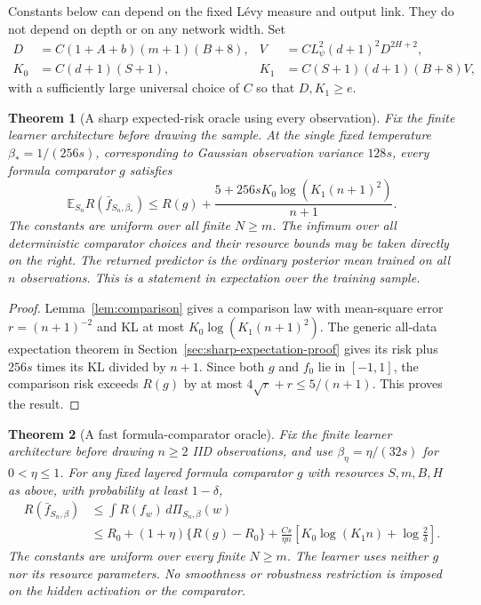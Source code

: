 \documentclass[11pt]{article}
\newtheorem{theorem}{Theorem}[section]\newtheorem{lemma}[theorem]{Lemma}
\theoremstyle{remark}\newtheorem{remark}[theorem]{Remark}
\newcommand{\E}{\mathbb E}\newcommand{\R}{\mathbb R}\newcommand{\Pp}{\mathbb P}
\begin{document}
Constants below can depend on the fixed L\'evy measure and output link. They do not depend on depth or on any network width. Set
\begin{align}
 D&=C(1+A+b)(m+1)(B+8),&
 V&=C L_\psi^2(d+1)^2D^{2H+2},\\
 K_0&=C(d+1)(S+1),&
 K_1&=C(S+1)(d+1)(B+8)V,
 \label{eq:resources}
\end{align}
with a sufficiently large universal choice of $C$ so that $D,K_1\ge e$.

\begin{theorem}[A sharp expected-risk oracle using every observation]
\label{thm:sharp-expectation}
Fix the finite learner architecture before drawing the sample. At the single fixed temperature $\beta_*=1/(256s)$, corresponding to Gaussian observation variance $128s$, every formula comparator $g$ satisfies
\begin{equation}
 \E_{S_n}R(\bar f_{S_n,\beta_*})
 \le R(g)+\frac{5+256sK_0\log(K_1(n+1)^2)}{n+1}.
 \label{eq:sharp-expectation}
\end{equation}
The constants are uniform over all finite $N\ge m$. The infimum over all deterministic comparator choices and their resource bounds may be taken directly on the right. The returned predictor is the ordinary posterior mean trained on all $n$ observations. This is a statement in expectation over the training sample.
\end{theorem}
\begin{proof}
Lemma~\ref{lem:comparison} gives a comparison law with mean-square error
$r=(n+1)^{-2}$ and KL at most $K_0\log(K_1(n+1)^2)$.
The generic all-data expectation theorem in Section~\ref{sec:sharp-expectation-proof} gives its risk plus $256s$ times its KL divided by $n+1$. Since both $g$ and $f_0$ lie in $[-1,1]$, the comparison risk exceeds $R(g)$ by at most $4\sqrt r+r\le5/(n+1)$. This proves the result.
\end{proof}

\begin{theorem}[A fast formula-comparator oracle]\label{thm:main}
Fix the finite learner architecture before drawing $n\ge2$ IID observations, and use $\beta_\eta=\eta/(32s)$ for $0<\eta\le1$. For any fixed layered formula comparator $g$ with resources $S,m,B,H$ as above, with probability at least $1-\delta$,
\begin{align}
 R(\bar f_{S_n,\beta})
 &\le\int R(f_w)\,d\Pi_{S_n,\beta}(w)\\
 &\le R_0+(1+\eta)\{R(g)-R_0\}
 +\frac{Cs}{\eta n}
       \left[K_0\log(K_1n)+\log\frac2\delta\right].
 \label{eq:main-oracle}
\end{align}
The constants are uniform over every finite $N\ge m$. The learner uses neither $g$ nor its resource parameters. No smoothness or robustness restriction is imposed on the hidden activation or the comparator.
\end{theorem}
\end{document}

